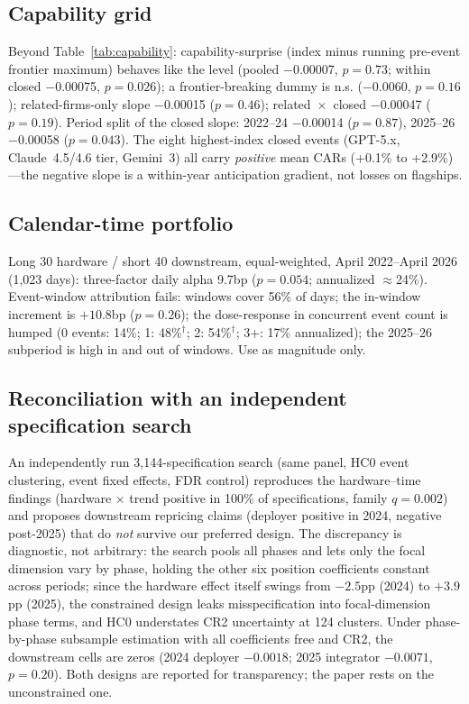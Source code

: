 \documentclass[review,12pt,authoryear]{elsarticle}
\begin{document}
\subsection{Capability grid}
Beyond Table~\ref{tab:capability}: capability-surprise (index minus running
pre-event frontier maximum) behaves like the level (pooled $-$0.00007,
$p=0.73$; within closed $-$0.00075, $p=0.026$); a frontier-breaking dummy is
n.s. ($-$0.0060, $p=0.16$); related-firms-only slope $-$0.00015 ($p=0.46$);
related~$\times$~closed $-$0.00047 ($p=0.19$). Period split of the closed
slope: 2022--24 $-$0.00014 ($p=0.87$), 2025--26 $-$0.00058 ($p=0.043$). The
eight highest-index closed events (GPT-5.x, Claude~4.5/4.6 tier, Gemini~3)
all carry \emph{positive} mean CARs (+0.1\% to +2.9\%)---the negative slope
is a within-year anticipation gradient, not losses on flagships.

\subsection{Calendar-time portfolio}
Long 30 hardware / short 40 downstream, equal-weighted, April 2022--April
2026 (1,023 days): three-factor daily alpha 9.7bp ($p=0.054$; annualized
$\approx$24\%). Event-window attribution fails: windows cover 56\% of days;
the in-window increment is $+10.8$bp ($p=0.26$); the dose-response in
concurrent event count is humped (0 events: 14\%; 1: 48\%$^{\dagger}$;
2: 54\%$^{\dagger}$; 3+: 17\% annualized); the 2025--26 subperiod is high in
and out of windows. Use as magnitude only.

\subsection{Reconciliation with an independent specification search}
An independently run 3,144-specification search (same panel, HC0 event
clustering, event fixed effects, FDR control) reproduces the hardware--time
findings (hardware $\times$ trend positive in 100\% of specifications,
family $q=0.002$) and proposes downstream repricing claims (deployer
positive in 2024, negative post-2025) that do \emph{not} survive our
preferred design. The discrepancy is diagnostic, not arbitrary: the search
pools all phases and lets only the focal dimension vary by phase, holding
the other six position coefficients constant across periods; since the
hardware effect itself swings from $-2.5$pp (2024) to $+3.9$pp (2025),
the constrained design leaks misspecification into focal-dimension phase
terms, and HC0 understates CR2 uncertainty at 124 clusters. Under
phase-by-phase subsample estimation with all coefficients free and CR2,
the downstream cells are zeros (2024 deployer $-0.0018$; 2025 integrator
$-0.0071$, $p=0.20$). Both designs are reported for transparency; the paper
rests on the unconstrained one.
\end{document}

